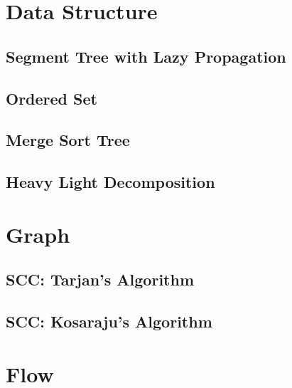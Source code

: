 \documentclass[10pt, a4paper]{article}
\begin{document}
\section{Data Structure}

\subsection{Segment Tree with Lazy Propagation}


\subsection{Ordered Set}


\subsection{Merge Sort Tree}


\subsection{Heavy Light Decomposition}




\section{Graph}

\subsection{SCC: Tarjan's Algorithm}


\subsection{SCC: Kosaraju's Algorithm}


% 



\section{Flow}
\end{document}
